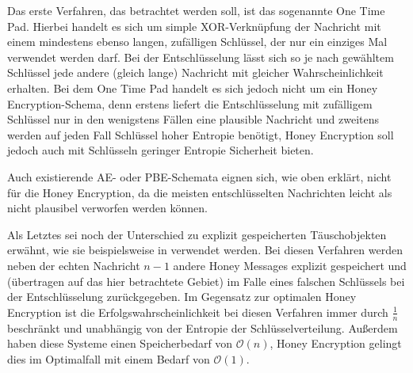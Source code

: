 Das erste Verfahren, das betrachtet werden soll, ist das sogenannte One Time Pad. Hierbei handelt es sich um simple XOR-Verknüpfung der Nachricht mit einem mindestens ebenso langen, zufälligen Schlüssel, der nur ein einziges Mal verwendet werden darf. Bei der Entschlüsselung lässt sich so je nach gewähltem Schlüssel jede andere (gleich lange) Nachricht mit gleicher Wahrscheinlichkeit erhalten. Bei dem One Time Pad handelt es sich jedoch nicht um ein Honey Encryption-Schema, denn erstens liefert die Entschlüsselung mit zufälligem Schlüssel nur in den wenigstens Fällen eine plausible Nachricht und zweitens werden auf jeden Fall Schlüssel hoher Entropie benötigt, Honey Encryption soll jedoch auch mit Schlüsseln geringer Entropie Sicherheit bieten.

Auch existierende AE- oder PBE-Schemata eignen sich, wie oben erklärt, nicht für die Honey Encryption, da die meisten entschlüsselten Nachrichten leicht als nicht plausibel verworfen werden können.

Als Letztes sei noch der Unterschied zu explizit gespeicherten Täuschobjekten erwähnt, wie sie beispielsweise in \cite{ACM13} verwendet werden. Bei diesen Verfahren werden neben der echten Nachricht \(n-1\) andere Honey Messages explizit gespeichert und (übertragen auf das hier betrachtete Gebiet) im Falle eines falschen Schlüssels bei der Entschlüsselung zurückgegeben. Im Gegensatz zur optimalen Honey Encryption ist die Erfolgswahrscheinlichkeit bei diesen Verfahren immer durch \(\frac{1}{n}\) beschränkt und unabhängig von der Entropie der Schlüsselverteilung. Außerdem haben diese Systeme einen Speicherbedarf von \(\mathcal{O}(n)\), Honey Encryption gelingt dies im Optimalfall mit einem Bedarf von \(\mathcal{O}(1)\).